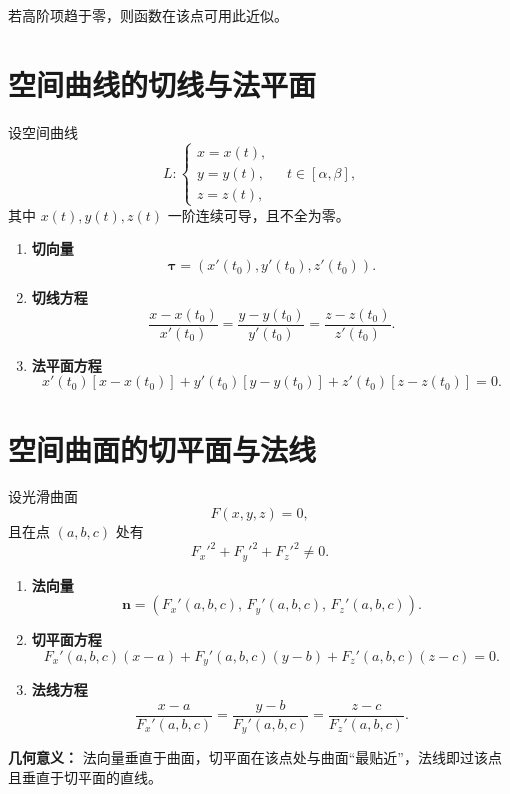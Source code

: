若高阶项趋于零，则函数在该点可用此近似。

\section{空间曲线的切线与法平面}

设空间曲线
\[
    L:\begin{cases}
        x = x(t), \\
        y = y(t), \\
        z = z(t),
    \end{cases}
    \quad t \in [\alpha, \beta],
\]
其中 $x(t),y(t),z(t)$ 一阶连续可导，且不全为零。

\begin{enumerate}
    \item \textbf{切向量}
          \[
              \boldsymbol{\tau} = (x'(t_0), y'(t_0), z'(t_0)).
          \]
    \item \textbf{切线方程}
          \[
              \frac{x - x(t_0)}{x'(t_0)}
              = \frac{y - y(t_0)}{y'(t_0)}
              = \frac{z - z(t_0)}{z'(t_0)}.
          \]
    \item \textbf{法平面方程}
          \[
              x'(t_0)[x - x(t_0)] + y'(t_0)[y - y(t_0)] + z'(t_0)[z - z(t_0)] = 0.
          \]
\end{enumerate}

\section{空间曲面的切平面与法线}

设光滑曲面
\[
    F(x,y,z) = 0,
\]
且在点 $(a,b,c)$ 处有
\[
    F_x'^2 + F_y'^2 + F_z'^2 \ne 0.
\]

\begin{enumerate}
    \item \textbf{法向量}
          \[
              \boldsymbol{n} = (F_x'(a,b,c),\, F_y'(a,b,c),\, F_z'(a,b,c)).
          \]

    \item \textbf{切平面方程}
          \[
              F_x'(a,b,c)(x - a)
              + F_y'(a,b,c)(y - b)
              + F_z'(a,b,c)(z - c)
              = 0.
          \]

    \item \textbf{法线方程}
          \[
              \frac{x - a}{F_x'(a,b,c)}
              = \frac{y - b}{F_y'(a,b,c)}
              = \frac{z - c}{F_z'(a,b,c)}.
          \]
\end{enumerate}

\textbf{几何意义：}
法向量垂直于曲面，切平面在该点处与曲面“最贴近”，法线即过该点且垂直于切平面的直线。